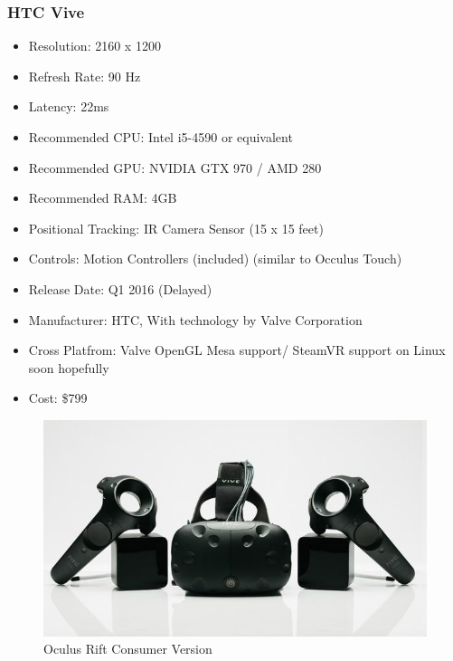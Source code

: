 \documentclass[a4paper,10pt]{article}
\begin{document}
\subsubsection{HTC Vive}
	\begin{itemize}
	  \item Resolution: 2160 x 1200
	  \item Refresh Rate: 90 Hz
	  \item Latency: 22ms
	  \item Recommended CPU: Intel i5-4590 or equivalent
	  \item Recommended GPU: NVIDIA GTX 970 / AMD 280 
	  \item Recommended RAM: 4GB
	  \item Positional Tracking: IR Camera Sensor (15 x 15 feet)
	  \item Controls: Motion Controllers (included) (similar to Occulus Touch)  
	  \item Release Date: Q1 2016 (Delayed)
	  \item Manufacturer: HTC, With technology by Valve Corporation
	  \item Cross Platfrom: Valve OpenGL Mesa support/ SteamVR support on Linux soon hopefully
	  \item Cost: \$799
	\end{itemize}
	\begin{figure}[H]
	\includegraphics[width=\linewidth,height=\paperheight,keepaspectratio]{vive.jpg}
	\caption{Oculus Rift Consumer Version}
	\label{fig:ViveImg}
	\end{figure}
	\pagebreak
\end{document}
